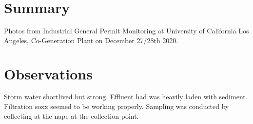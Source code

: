 \documentclass{article}
\begin{document}
\section*{Summary}

Photos from Industrial General Permit Monitoring at University of California Los
Angeles, Co-Generation Plant on December 27/28th 2020.

\section*{Observations}

Storm water shortlived but strong.  Effluent had was heavily laden with
sediment.  Filtration soxx seemed to be working properly.  Sampling was
conducted by collecting at the nape at the collection point.

\newpage


\end{document}
